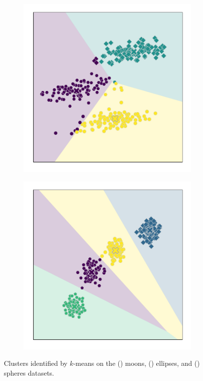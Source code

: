 \begin{figure}
\begin{subfigure}{.333\textwidth}
        \includegraphics[width=\linewidth]{kmeans/ellipses}
        \caption{}\label{fig:kmeans_ellipses}
    \end{subfigure}%
    \hfill%
    \begin{subfigure}{.333\textwidth}
        \includegraphics[width=\linewidth]{kmeans/spheres}
        \caption{}\label{fig:kmeans_spheres}
    \end{subfigure}
    \caption{%
        Clusters identified by \(k\)-means on the ()
        moons, () ellipses, and
        () spheres datasets.%
    }\label{fig:kmeans_examples}
\end{figure}

